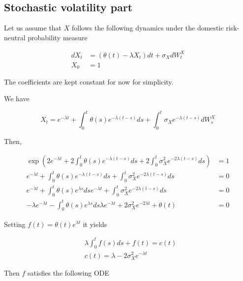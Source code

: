 \documentclass{article}
\begin{document}
\subsection{Stochastic volatility part}
Let us assume that $X$ follows the following dynamics under the domestic risk-neutral probability measure

\begin{equation}
\begin{aligned}
	dX_t &= (\theta(t) - \lambda X_t) dt + \sigma_X dW_t^X\\
	X_0 &= 1
\end{aligned}
\end{equation}

\noindent The coefficients are kept constant for now for simplicity.

\noindent We have 

\begin{equation}
	X_t = e^{-\lambda t} + \int_{0}^t \theta(s) e^{-\lambda (t-s)} ds + \int_0^t \sigma_X e^{-\lambda(t-s)} dW_s^X
\end{equation}

\noindent Then,

\begin{equation*}
\begin{aligned}
	\exp\left(2e^{-\lambda t} + 2\int_{0}^t \theta(s) e^{-\lambda (t-s)} ds + 2\int_0^t \sigma_X^2 e^{-2\lambda(t-s)} ds\right) &= 1\\
	e^{-\lambda t} + \int_{0}^t \theta(s) e^{-\lambda (t-s)} ds + \int_0^t \sigma_X^2 e^{-2\lambda(t-s)} ds &= 0\\
	e^{-\lambda t} + \int_{0}^t \theta(s) e^{\lambda s} ds e^{-\lambda t} + \int_0^t \sigma_X^2 e^{-2\lambda(t-s)} ds &= 0\\
	-\lambda e^{-\lambda t} - \int_{0}^t \theta(s) e^{\lambda s} ds \lambda e^{-\lambda t} + 2 \sigma_X^2 e^{-2\lambda t} + \theta(t) &= 0
\end{aligned}
\end{equation*}

Setting $f(t) = \theta(t) e^{\lambda t}$ it yields

\begin{equation}
\begin{aligned}
	&\lambda \int_0^t f(s) ds + f(t) = c(t)\\
	&c(t) = \lambda - 2\sigma_X^2 e^{-\lambda t}
\end{aligned}
\end{equation}

\noindent Then $f$ satisfies the following ODE
\end{document}
